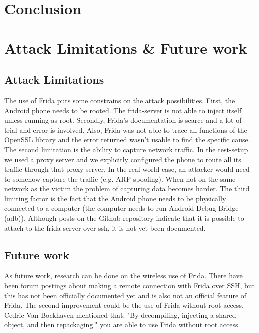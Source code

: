 \documentclass[12pt, a4paper]{report}
\begin{document}
\chapter{Conclusion}


\chapter{Attack Limitations \& Future work}


\section{Attack Limitations}
The use of Frida puts some constrains on the attack possibilities. First, the Android phone needs to be rooted. The frida-server is not able to inject itself unless running as root. Secondly, Frida's documentation is scarce and a lot of trial and error is involved. Also, Frida was not able to trace all functions of the OpenSSL library and the error returned wasn’t usable to find the specific cause.  
\newline
\newline
The second limitation is the ability to capture network traffic. In the test-setup we used a proxy server and we explicitly configured the phone to route all its traffic through that proxy server. In the real-world case, an attacker would need to somehow capture the traffic (e.g. ARP spoofing). When not on the same network as the victim the problem of capturing data becomes harder. 
\newline
\newline
The third limiting factor is the fact that the Android phone needs to be physically connected to a computer (the computer needs to run Android Debug Bridge (adb)). Although posts on the Github repository indicate that it is possible to attach to the frida-server over ssh, it is not yet been documented.   


\section{Future work}

As future work, research can be done on the wireless use of Frida. There have been forum postings about making a remote connection with Frida over SSH, but this has not been officially documented yet and is also not an official feature of Frida.
\newline
\newline
The second improvement could be the use of Frida without root access. Cedric Van Bockhaven mentioned that: "By decompiling, injecting a shared object, and then repackaging." you are able to use Frida without root access.
\end{document}
